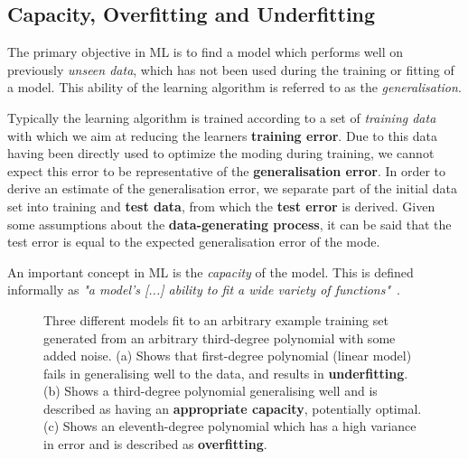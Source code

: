 \subsection{Capacity, Overfitting and Underfitting}
The primary objective in \gls{ML} is to find a model which performs well on
previously \textit{unseen data}, which has not been used during the training or
fitting of a model. This ability of the learning algorithm is referred to as the
\textit{generalisation}.

Typically the learning algorithm is trained according to a set of
\textit{training data} with which we aim at reducing the learners
\textbf{training error}. Due to this data having been directly used to optimize
the moding during training, we cannot expect this error to be representative of
the \textbf{generalisation error}. In order to derive an estimate of the
generalisation error, we separate part of the initial data set into training and
\textbf{test data}, from which the \textbf{test error} is derived. Given some
assumptions about the \textbf{data-generating process}, it can be said that the
test error is equal to the expected generalisation error of the mode.

An important concept in \gls{ML} is the \textit{capacity} of the model. This is
defined informally as \textit{"a model’s [...] ability to fit a wide
variety of functions"}~\cite[p.~111-112]{Goodfellow-et-al-2016}.

\begin{figure}[htp]
    \centering
    
    \captionsetup{format=hang} %
    \caption{
        Three different models fit to an arbitrary example training set
        generated from an arbitrary third-degree polynomial with some added
        noise. (a) Shows that first-degree polynomial (linear model) fails in
        generalising well to the data, and results in \textbf{underfitting}. (b)
        Shows a third-degree polynomial generalising well and is described as
        having an \textbf{appropriate capacity}, potentially optimal. (c) Shows
        an eleventh-degree polynomial which has a high variance in error and is
        described as \textbf{overfitting}.
    }
    \label{fig:mlp}
\end{figure}

